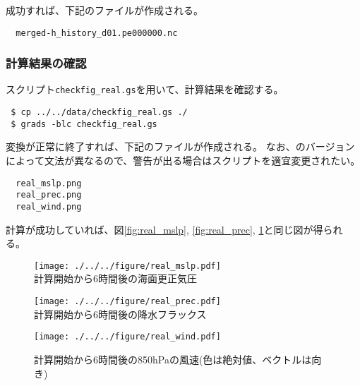 成功すれば、下記のファイルが作成される。

\begin{verbatim}
  merged-h_history_d01.pe000000.nc
\end{verbatim}




\subsubsection{計算結果の確認}


\grads スクリプト\verb|checkfig_real.gs|を用いて、計算結果を確認する。
\begin{verbatim}
 $ cp ../../data/checkfig_real.gs ./
 $ grads -blc checkfig_real.gs
\end{verbatim}
変換が正常に終了すれば、下記のファイルが作成される。
なお、\grads のバージョンによって文法が異なるので、警告が出る場合はスクリプトを適宜変更されたい。
\begin{verbatim}
  real_mslp.png
  real_prec.png
  real_wind.png
\end{verbatim}
計算が成功していれば、図\ref{fig:real_mslp}, \ref{fig:real_prec}, \ref{fig:real_wind}と同じ図が得られる。


\begin{figure}[h]
\begin{center}
  \texttt{[image: ./../../figure/real\_mslp.pdf]}\\
  \caption{計算開始から6時間後の海面更正気圧}
  \label{fig:real_mslp}
\end{center}
\begin{center}
  \texttt{[image: ./../../figure/real\_prec.pdf]}\\
  \caption{計算開始から6時間後の降水フラックス}
  \label{fig:real_prec}
\end{center}
\begin{center}
  \texttt{[image: ./../../figure/real\_wind.pdf]}\\
  \caption{計算開始から6時間後の850hPaの風速(色は絶対値、ベクトルは向き)}
  \label{fig:real_wind}
\end{center}
\end{figure}
